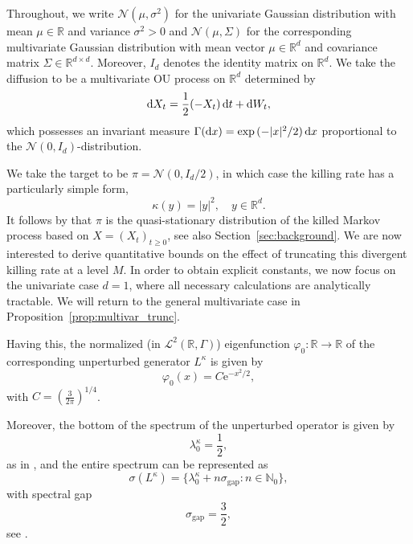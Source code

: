 \documentclass{aptpub}
\newcommand{\R}{\mathbb R}
\newcommand{\Rd}{\mathbb R^d}
\begin{document}
Throughout, we write $\mathcal N(\mu, \sigma^2)$ for the univariate Gaussian distribution with mean $\mu\in\R$ and variance $\sigma^2>0$ and $\mathcal N(\mu, \Sigma)$ for the corresponding multivariate Gaussian distribution with mean vector $\mu \in \Rd$ and covariance matrix $\Sigma \in \R^{d\times d}$. Moreover, $I_d$ denotes the identity matrix on $\Rd$.
We take the diffusion to be a multivariate OU process on $\Rd$ determined by
\begin{equation}
    \dif X_t = \frac{1}{2}(-X_t) \dif t + \dif W_t,
    \label{eq:OU}
\end{equation}
which possesses an invariant measure $\Gamma(\dif x) = \exp{(-\vert x\vert ^2/2)}\dif x$ proportional to the $\mathcal N(0,I_d)$-distribution.

We take the target to be $\pi=\mathcal N(0,I_d/2)$, in which case the killing rate has a particularly simple form, 
\begin{equation}
    \kappa(y) = \vert y\vert ^2, \quad y \in \Rd.
    \label{eq:killing_rate_OU}
\end{equation}
It follows by \cite{Wang2019TheoQSMC} that $\pi$ is the quasi-stationary distribution of the killed Markov
process based on $X=(X_t)_{t\geq0}$, see also Section~\ref{sec:background}. 
We are now interested to derive quantitative bounds on the effect of truncating this divergent killing rate at a level $M$. In order to obtain explicit constants, we now focus on the univariate case $d=1$, where all necessary calculations are analytically tractable. We will return to the general multivariate case in Proposition~\ref{prop:multivar_trunc}.

Having this, the normalized (in $\mathcal L^2(\R,\Gamma)$) eigenfunction $\varphi_0\colon\R\to\R$ of the corresponding unperturbed generator $L^\kappa$ is given by
\begin{equation*}
    \varphi_0(x) = C \mathrm e^{-{x^2}/{2}},
\end{equation*}
with $C=(\frac{3}{2\pi})^{1/4}$.


Moreover, the bottom of the spectrum of the unperturbed operator is given by
\begin{equation}
    \lambda_0^\kappa = \frac{1}{2},
\end{equation}
as in \cite[(2.4)]{Wang2019TheoQSMC}, and the entire spectrum can be represented as
\begin{equation}
    \sigma(L^\kappa) = \{\lambda_0^\kappa+ n \sigma_\mathrm{gap}:n\in \mathbb N_0\},
    \label{eq:unperturbed_spec}
\end{equation}
with spectral gap 
\begin{equation*}
    \sigma_\mathrm{gap} = \frac{3}{2},
\end{equation*}
see \cite{Metafune2002}.
\end{document}
